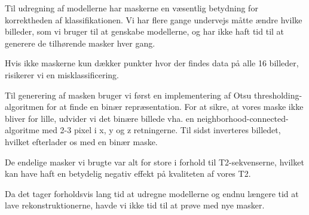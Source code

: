 Til udregning af modellerne har maskerne en væsentlig betydning for korrektheden af klassifikationen. Vi har flere gange undervejs måtte ændre hvilke billeder, som vi bruger til at genskabe modellerne, og har ikke haft tid til at generere de tilhørende masker hver gang.

Hvis ikke maskerne kun dækker punkter hvor der findes data på alle 16 billeder, risikerer vi en misklassificering. 

Til generering af masken bruger vi først en implementering af Otsu
thresholding-algoritmen for at finde en binær repræsentation. For at
sikre, at vores maske ikke bliver for lille, udvider vi det binære billede
vha. en neighborhood-connected-algoritme med 2-3 pixel i x, y og z
retningerne. Til sidst inverteres billedet, hvilket efterlader os med en
binær maske.

De endelige masker vi brugte var alt for store i forhold til T2-sek\-ven\-serne, hvilket kan have haft en betydelig negativ effekt på kvaliteten af vores T2.

Da det tager forholdsvis lang tid at udregne modellerne og endnu længere tid at lave rekonstruktionerne, havde vi ikke tid til at prøve med nye masker.

